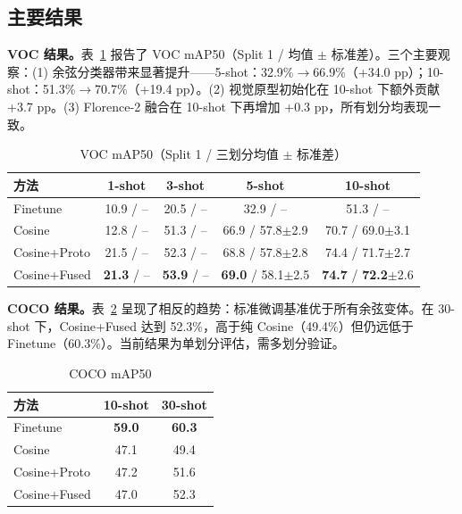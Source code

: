 \documentclass[conference]{IEEEtran}
\begin{document}
\subsection{主要结果}

\textbf{VOC 结果。}表~\ref{tab:voc_main} 报告了 VOC mAP50（Split 1 / 均值 $\pm$ 标准差）。三个主要观察：(1) 余弦分类器带来显著提升——5-shot：32.9\%$\rightarrow$66.9\%（+34.0 pp）；10-shot：51.3\%$\rightarrow$70.7\%（+19.4 pp）。(2) 视觉原型初始化在 10-shot 下额外贡献 +3.7 pp。(3) Florence-2 融合在 10-shot 下再增加 +0.3 pp，所有划分均表现一致。

\begin{table}[t]
\centering\footnotesize
\caption{VOC mAP50（Split 1 / 三划分均值 $\pm$ 标准差）}
\label{tab:voc_main}
\begin{tabular}{lcccc}
\toprule
方法 & 1-shot & 3-shot & 5-shot & 10-shot \\
\midrule
Finetune      & 10.9 / --   & 20.5 / --    & 32.9 / --    & 51.3 / --     \\
Cosine        & 12.8 / --   & 51.3 / --    & 66.9 / 57.8$\pm$2.9 & 70.7 / 69.0$\pm$3.1 \\
Cosine+Proto  & 21.5 / --   & 52.3 / --    & 68.8 / 57.8$\pm$2.8 & 74.4 / 71.7$\pm$2.7 \\
Cosine+Fused  & \textbf{21.3} / -- & \textbf{53.9} / -- & \textbf{69.0} / 58.1$\pm$2.5 & \textbf{74.7} / \textbf{72.2}$\pm$2.6 \\
\bottomrule
\end{tabular}
\end{table}

\textbf{COCO 结果。}表~\ref{tab:coco_main} 呈现了相反的趋势：标准微调基准优于所有余弦变体。在 30-shot 下，Cosine+Fused 达到 52.3\%，高于纯 Cosine（49.4\%）但仍远低于 Finetune（60.3\%）。当前结果为单划分评估，需多划分验证。

\begin{table}[ht]
\centering
\caption{COCO mAP50}
\label{tab:coco_main}
\begin{tabular}{lcc}
\toprule
方法 & 10-shot & 30-shot \\
\midrule
Finetune      & \textbf{59.0} & \textbf{60.3} \\
Cosine        & 47.1 & 49.4 \\
Cosine+Proto  & 47.2 & 51.6 \\
Cosine+Fused  & 47.0 & 52.3 \\
\bottomrule
\end{tabular}
\end{table}
\end{document}
